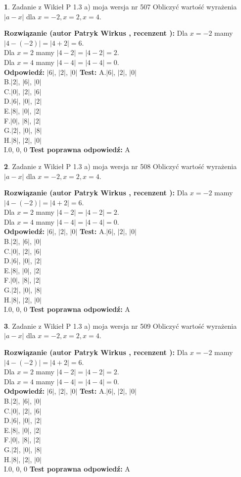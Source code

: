 \documentclass[12pt, a4paper]{article}
\theoremstyle{definition} %
\newtheorem{zad}{}
\newcommand{\zadStart}[1]{\begin{zad}#1\newline}
\newcommand{\zadStop}{\end{zad}}
\newcommand{\rozwStart}[2]{\noindent \textbf{Rozwiązanie (autor #1 , recenzent #2): }\newline}
\newcommand{\rozwStop}{\newline}
\newcommand{\odpStart}{\noindent \textbf{Odpowiedź:}\newline}
\newcommand{\odpStop}{\newline}
\newcommand{\testStart}{\noindent \textbf{Test:}\newline}
\newcommand{\testStop}{\newline}
\newcommand{\kluczStart}{\noindent \textbf{Test poprawna odpowiedź:}\newline}
\newcommand{\kluczStop}{\newline}
\begin{document}
\zadStart{Zadanie z Wikieł P 1.3 a) moja wersja nr 507}
Obliczyć wartość wyrażenia $|a - x|$ dla $x=-2,x=2,x=4$.
\zadStop
\rozwStart{Patryk Wirkus}{}
Dla $x = -2$ mamy $|4 - (-2)| = |4 + 2| = 6$.\\
Dla $x = 2$ mamy $|4 - 2| = |4 - 2| = 2$.\\
Dla $x = 4$ mamy $|4 - 4| = |4 - 4| = 0$.\\
\rozwStop
\odpStart
$|6|$, $|2|$, $|0|$
\odpStop
\testStart
A.$|6|$, $|2|$, $|0|$\\
B.$|2|$, $|6|$, $|0|$\\
C.$|0|$, $|2|$, $|6|$\\
D.$|6|$, $|0|$, $|2|$\\
E.$|8|$, $|0|$, $|2|$\\
F.$|0|$, $|8|$, $|2|$\\
G.$|2|$, $|0|$, $|8|$\\
H.$|8|$, $|2|$, $|0|$\\
I.$0$, $0$, $0$
\testStop
\kluczStart
A
\kluczStop



\zadStart{Zadanie z Wikieł P 1.3 a) moja wersja nr 508}
Obliczyć wartość wyrażenia $|a - x|$ dla $x=-2,x=2,x=4$.
\zadStop
\rozwStart{Patryk Wirkus}{}
Dla $x = -2$ mamy $|4 - (-2)| = |4 + 2| = 6$.\\
Dla $x = 2$ mamy $|4 - 2| = |4 - 2| = 2$.\\
Dla $x = 4$ mamy $|4 - 4| = |4 - 4| = 0$.\\
\rozwStop
\odpStart
$|6|$, $|2|$, $|0|$
\odpStop
\testStart
A.$|6|$, $|2|$, $|0|$\\
B.$|2|$, $|6|$, $|0|$\\
C.$|0|$, $|2|$, $|6|$\\
D.$|6|$, $|0|$, $|2|$\\
E.$|8|$, $|0|$, $|2|$\\
F.$|0|$, $|8|$, $|2|$\\
G.$|2|$, $|0|$, $|8|$\\
H.$|8|$, $|2|$, $|0|$\\
I.$0$, $0$, $0$
\testStop
\kluczStart
A
\kluczStop



\zadStart{Zadanie z Wikieł P 1.3 a) moja wersja nr 509}
Obliczyć wartość wyrażenia $|a - x|$ dla $x=-2,x=2,x=4$.
\zadStop
\rozwStart{Patryk Wirkus}{}
Dla $x = -2$ mamy $|4 - (-2)| = |4 + 2| = 6$.\\
Dla $x = 2$ mamy $|4 - 2| = |4 - 2| = 2$.\\
Dla $x = 4$ mamy $|4 - 4| = |4 - 4| = 0$.\\
\rozwStop
\odpStart
$|6|$, $|2|$, $|0|$
\odpStop
\testStart
A.$|6|$, $|2|$, $|0|$\\
B.$|2|$, $|6|$, $|0|$\\
C.$|0|$, $|2|$, $|6|$\\
D.$|6|$, $|0|$, $|2|$\\
E.$|8|$, $|0|$, $|2|$\\
F.$|0|$, $|8|$, $|2|$\\
G.$|2|$, $|0|$, $|8|$\\
H.$|8|$, $|2|$, $|0|$\\
I.$0$, $0$, $0$
\testStop
\kluczStart
A
\kluczStop
\end{document}
